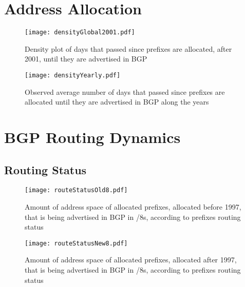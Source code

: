 \documentclass[11pt,a4paper]{scrreprt}
\begin{document}
\section{Address Allocation}

\begin{figure}[!h]
\centering
\texttt{[image: densityGlobal2001.pdf]}
\caption{Density plot of days that passed since prefixes are allocated, after 2001, until they are advertised in BGP}
\label{fig:densityGlobal2001}
\end{figure}


\begin{figure}[!h]
\centering
\texttt{[image: densityYearly.pdf]}
\caption{Observed average number of days that passed since prefixes are allocated until they are advertised in BGP along the years}
\label{fig:densityYearly}
\end{figure}


\section{BGP Routing Dynamics}

\subsection{Routing Status}

\begin{figure}[!h]
\centering
\texttt{[image: routeStatusOld8.pdf]}
\caption{Amount of address space of allocated prefixes, allocated before 1997, that is being advertised in BGP in /8s, according to prefixes routing status}
\label{fig:routingStatusOld8}
\end{figure}

\begin{figure}[!h]
\centering
\texttt{[image: routeStatusNew8.pdf]}
\caption{Amount of address space of allocated prefixes, allocated after 1997, that is being advertised in BGP in /8s, according to prefixes routing status}
\label{fig:routingStatusNew8}
\end{figure}
\end{document}
